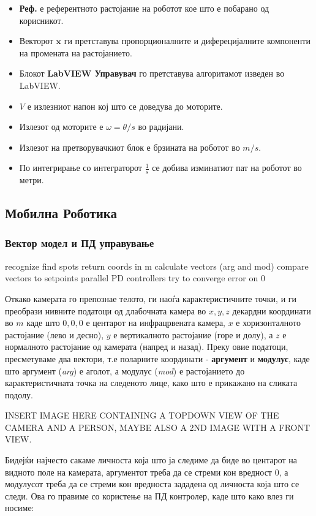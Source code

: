 \documentclass[12pt]{article}
\renewcommand{\vec}[1]{\mathbf{#1}}
\begin{document}
    \begin{itemize}
      \item \textbf{Реф.} е референтното растојание на роботот кое што е побарано од корисникот.
      \item Векторот $\vec{x}$ ги претставува пропорционалните и диферецијалните компоненти на промената на растојанието.
      \item Блокот \textbf{LabVIEW Управувач} го претставува алгоритамот изведен во LabVIEW.
      \item $V$ е излезниот напон кој што се доведува до моторите.
      \item Излезот од моторите е $\omega = \theta/s$ во радијани.
      \item Излезот на претворувачкиот блок е брзината на роботот во $m/s$.
      \item По интегрирање со интеграторот $\frac{1}{s}$ се добива изминатиот пат на роботот во метри.
    \end{itemize}

  \subsection{Мобилна Роботика}

    \subsubsection{Вектор модел и ПД управување}
      recognize
      find spots
      return coords in m
      calculate vectors (arg and mod)
      compare vectors to setpoints
      parallel PD controllers try to converge error on 0

      Откако камерата го препознае телото, ги наоѓа карактеристичните точки, и ги преобрази нивните податоци од длабочната камера во $ x,y,z $ декардни координати во $ m $ каде што $ 0,0,0 $ е центарот на инфрацрвената камера, $x$ е хоризонталното растојание (лево и десно), $y$ е вертикалното растојание (горе и долу), а $z$ е нормалното растојание од камерата (напред и назад). Преку овие податоци, пресметуваме два вектори, т.е поларните координати - \textbf{аргумент} и \textbf{модулус}, каде што аргумент (\textit{arg}) е аголот, а модулус (\textit{mod}) е растојанието до карактеристичната точка на следеното лице, како што е прикажано на сликата подолу.

      INSERT IMAGE HERE CONTAINING A TOPDOWN VIEW OF THE CAMERA AND A PERSON, MAYBE ALSO A 2ND IMAGE WITH A FRONT VIEW.

      Бидејќи најчесто сакаме личноста која што ја следиме да биде во центарот на видното поле на камерата, аргументот треба да се стреми кон вредност 0, а модулусот треба да се стреми кон вредноста зададена од личноста која што се следи. Ова го правиме со користење на ПД контролер, каде што како влез ги носиме:
\end{document}
